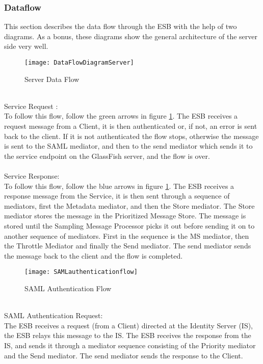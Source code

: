     \subsubsection{Dataflow}\label{Textual Server Dataflow} 
        This section describes the data flow through the ESB with the help of two diagrams. As a bonus, these diagrams show the general architecture of the server side very well.
\\
        \begin{figure}[h]
            \centering
            \texttt{[image: DataFlowDiagramServer]}
            \caption{Server Data Flow}
            \label{fig:DataFlowDiagramServer}
        \end{figure}
\\
Service Request :\\
To follow this flow, follow the green arrows in figure \ref{fig:DataFlowDiagramServer}. The ESB receives a request message from a Client, it is then authenticated or, if not, an error is sent back to the client. If it is not authenticated the flow stops, otherwise the message is sent to the SAML mediator, and then to the send mediator which sends it to the service endpoint on the GlassFish server, and the flow is over.
\\\\
Service Response:\\
To follow this flow, follow the blue arrows in figure \ref{fig:DataFlowDiagramServer}. The ESB receives a response message from the Service, it is then sent through a sequence of mediators, first the Metadata mediator, and then  the Store mediator. The Store mediator stores the message in the Prioritized Message Store. The message is stored until the Sampling Message Processor picks it out before sending it on to another sequence of mediators. First in the sequence is the MS mediator, then the Throttle Mediator and finally the Send mediator. The send mediator sends the message back to the client and the flow is completed.
\\
    \begin{figure}[h]
        \centering
        \texttt{[image: SAMLauthenticationflow]}
        \caption{SAML Authentication Flow}
        \label{fig:SAMLauthenticationflow}
    \end{figure}
\\           
SAML Authentication Request:\\
The ESB receives a request (from a Client) directed at the Identity Server (IS), the ESB relays this message to the IS. The ESB receives the response from the IS, and sends it through a mediator sequence consisting of the Priority mediator and the Send mediator. The send mediator sends the response to the Client.

